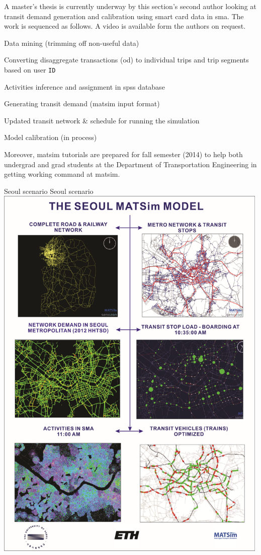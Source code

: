 A master's thesis is currently underway by this section's second author looking at transit demand generation and calibration using smart card data in \gls{sma}. The work is sequenced as follows. A video is available form the authors on request.
%
\begin{compactitem}
\item Data mining (trimming off non-useful data)
\item	Converting disaggregate transactions (\gls{od}) to individual trips and trip segments based on user \lstinline|ID|
\item	Activities inference and assignment in \gls{spss} database
\item	Generating transit demand (\gls{matsim} input format)
\item	Updated transit network \& schedule for running the simulation
\item	Model calibration (in process)
\end{compactitem}
%
Moreover, \gls{matsim} tutorials are prepared for fall semester (2014) to help both undergrad and grad students at the Department of Transportation Engineering in getting working command at \gls{matsim}.

\createfigure%
{Seoul scenario}%
{Seoul scenario}%
{\label{fig:seoul}}%
{\includegraphics[width=0.99\textwidth, angle=0]{using/figures/seoul}}%
{}

 
 
